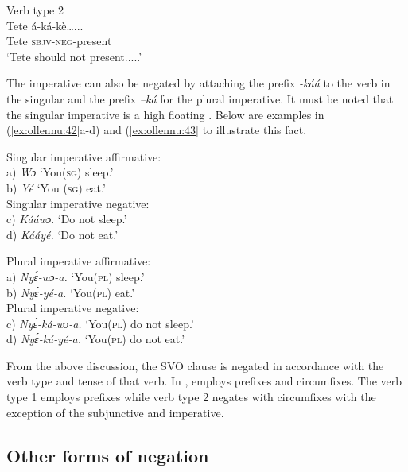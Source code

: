 \documentclass[output=paper
,newtxmath
,modfonts
,nonflat]{langsci/langscibook}
\begin{document}
\begin{minipage}{.5\textwidth}



\ea  Verb type 2 \\\label{ex:ollennu:41}
\gll Tete \'a-k\'a-k\`e…...\\
Tete \textsc{sbjv}-\textsc{neg}-present\\
\glt `Tete should not present.....'
\z
\end{minipage}

The imperative can also be negated by attaching the prefix \textit{-k\'a\'a} to the verb in the singular and the prefix \textit{–k\'a} for the plural imperative. It must be noted that the singular imperative is a high floating . Below are examples in (\ref{ex:ollennu:42}a-d) and (\ref{ex:ollennu:43} to illustrate this fact.

\ea \label{ex:ollennu:42}

Singular imperative affirmative:\\
a) \textit{Wɔ} \enspace  `You(\textsc{sg}) sleep.' \\
b) \textit{Y\'e} \enspace `You (\textsc{sg}) eat.'\\
Singular imperative negative:\\
c) \textit{K\'a\'awɔ}. \enspace `Do not sleep.' \\
d) \textit{K\'a\'ay\'e.} \enspace `Do not eat.'
\z

\ea \label{ex:ollennu:43} Plural imperative affirmative:\\
a) \textit{Ny\'ɛ-wɔ-a.} \enspace `You(\textsc{pl}) sleep.'\\
b)  \textit{Ny\'ɛ-y\'e-a.} \enspace `You(\textsc{pl}) eat.'\\
Plural imperative negative:\\
c) \textit{Ny\'ɛ-k\'a-wɔ-a.} \enspace `You(\textsc{pl}) do not sleep.' \\
d) \textit{Ny\'ɛ-k\'a-y\'e-a.} \enspace `You(\textsc{pl}) do not eat.'
\z

From the above discussion, the SVO clause is negated in accordance with the verb type and tense of that verb. In ,  employs prefixes and circumfixes. The verb type 1 employs prefixes while verb type 2 negates with circumfixes with the exception of the subjunctive and imperative.

\subsection{\label{sec:ollennu:2.4} Other forms of negation}
\end{document}
